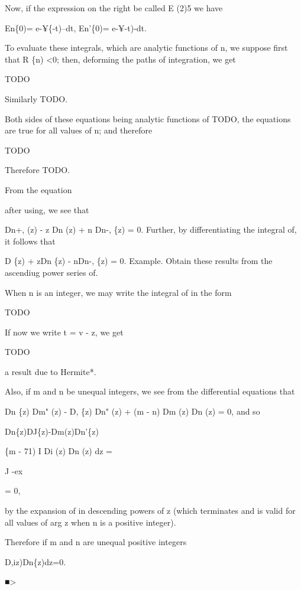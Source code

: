 Now, if the expression on the right be called E (2)5 we have

En\{0)= e-¥\{-t)--dt, En'\{0)= e-¥-t)-dt.

To evaluate these integrals, which are analytic functions of n, we
suppose first that R \{n) <0; then, deforming the paths of
integration, we get

TODO

Similarly TODO.

Both sides of these equations being analytic functions of TODO, the
equations are true for all values of n; and therefore

TODO

Therefore TODO.

%
%

From the equation

after using, we see that

Dn+, (z) - z Dn (z) + n Dn-, \{z) = 0. Further, by differentiating the
integral of, it follows that

D \{z) + zDn \{z) - nDn-, \{z) = 0. Example. Obtain these results
from the ascendiug power series of.


When n is an integer, we may write the integral of in the form

TODO

If now we write t = v - z, we get

TODO

a result due to Hermite*.

Also, if m and n be unequal integers, we see from the differential
equations that

Dn \{z) Dm" (z) - D, \{z) Dn" (z) + (m - n) Dm (z) Dn (z) = 0, and so

Dn\{z)DJ\{z)-Dm(z)Dn'\{z)

\{m - 71) I Di (z) Dn (z) dz =

J -ex

= 0,

by the expansion of in descending powers of z (which terminates
and is valid for all values of arg z when n is a positive integer).

Therefore if m and n are unequal positive integers

D,iz)Dn\{z)dz=0.

■>

